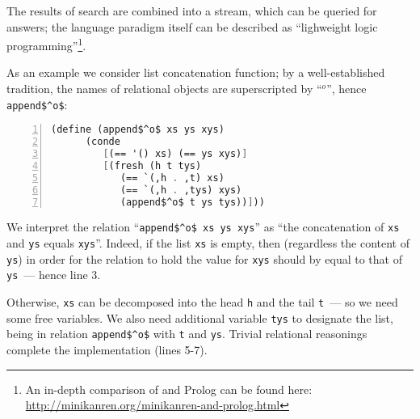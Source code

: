 The results of search are combined into a stream, which can be queried for answers; the language paradigm itself
can be described as ``lighweight logic programming''\footnote{An in-depth comparison of \miniKanren and Prolog can be found
here: \url{http://minikanren.org/minikanren-and-prolog.html}}.
 
As an example we consider list concatenation function; by a well-established tradition, the names 
of relational objects are superscripted by ``$^o$'', hence \lstinline{append$^o$}: 

\begin{lstlisting}[mathescape=true,language=scheme,numbers=left,numberstyle=\small,stepnumber=1,numbersep=-5pt]
   (define (append$^o$ xs ys xys) 
      (conde 
         [(== '() xs) (== ys xys)]
         [(fresh (h t tys)
            (== `(,h . ,t) xs)
            (== `(,h . ,tys) xys)
            (append$^o$ t ys tys))]))
\end{lstlisting}

We interpret the relation ``\lstinline{append$^o$ xs ys xys}'' as ``the concatenation of \lstinline{xs} and \lstinline{ys} 
equals \lstinline{xys}''. Indeed, if the list \lstinline{xs} is empty, then (regardless the content of \lstinline{ys}) in order for the relation to hold 
the value for \lstinline{xys} should by equal to that of \lstinline{ys}~--- hence line 3. 

Otherwise, \lstinline{xs} can be decomposed into the head \lstinline{h} and the tail \lstinline{t}~--- so we need some free variables. We also
need additional variable \lstinline{tys} to designate the list, being in relation \lstinline{append$^o$} with \lstinline{t} and \lstinline{ys}.
Trivial relational reasonings complete the implementation (lines 5-7).

